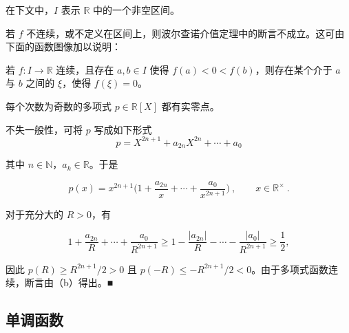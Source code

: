 在下文中，$ I $ 表示 $ \mathbb{R} $ 中的一个非空区间。

\begin{example}

\begin{items}
\item

若 $ f $ 不连续，或不定义在区间上，则波尔查诺介值定理中的断言不成立。这可由下面的函数图像加以说明：

\end{items}


\begin{items}
\item[（b）]

若 $f: I \to \mathbb{R}$ 连续，且存在 $a, b \in I$ 使得 $f(a) < 0 < f(b)$，则存在某个介于 $a$ 与 $b$ 之间的 $\xi$，使得 $f(\xi) = 0$。

\end{items}


\begin{items}
\item[（c）]

每个次数为奇数的多项式 $ p \in \mathbb{R}[X] $ 都有实零点。

\proofhead
不失一般性，可将 $ p $ 写成如下形式
\[
p=X^{2n+1}+a_{2n}X^{2n}+\cdots+a_{0}
\]

其中 $ n \in \mathbb{N} $，$ a_k \in \mathbb{R} $。于是

\[
p(x)=x^{2n+1}\Big(1+\frac{a_{2n}}{x}+\cdots+\frac{a_{0}}{x^{2n+1}}\Big)~,\qquad x\in\mathbb{R}^\times~.
\]

对于充分大的 $ R > 0 $，有

\[
1+\frac{a_{2n}}{R}+\cdots+\frac{a_{0}}{R^{2n+1}}\geq1-\frac{|a_{2n}|}{R}-\cdots-\frac{|a_{0}|}{R^{2n+1}}\geq\frac{1}{2},
\]

因此 $p(R) \geq R^{2n+1}/2 > 0$ 且 $p(-R) \leq -R^{2n+1}/2 < 0$。由于多项式函数连续，断言由（b）得出。■

\end{items}

\end{example}

\subsection*{单调函数}

